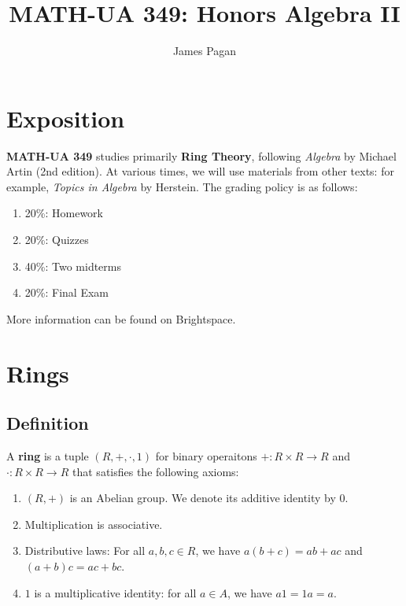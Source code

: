 \documentclass[11pt]{article}
\title{MATH-UA 349: Honors Algebra II}
\author{James Pagan}
\begin{document}
\maketitle
\tableofcontents
\newpage


\section{Exposition}

\textbf{MATH-UA 349} studies primarily \textbf{Ring Theory}, following \textit{Algebra} by Michael Artin (2nd edition). At various times, we will use materials from other texts: for example, \textit{Topics in Algebra} by Herstein. The grading policy is as follows:

\begin{enumerate}
	\item 20\%: Homework
	\item 20\%: Quizzes
	\item 40\%: Two midterms
	\item 20\%: Final Exam
\end{enumerate}

More information can be found on Brightspace.


\section{Rings}


\subsection{Definition}

A \textbf{ring} is a tuple $(R, +, \cdot, 1)$ for binary operaitons $+ : R \times R \to R$ and $\cdot : R \times R \to R$ that satisfies the following axioms: 
\begin{enumerate}
	\item $(R, +)$ is an Abelian group. We denote its additive identity by $0$.
	\item Multiplication is associative.
	\item Distributive laws: For all $a, b, c \in R$, we have $a(b + c) = ab + ac$ and $(a + b)c = ac + bc$.
	\item $1$ is a multiplicative identity: for all $a \in A$, we have $a1 = 1a = a$.
\end{enumerate}
\end{document}

